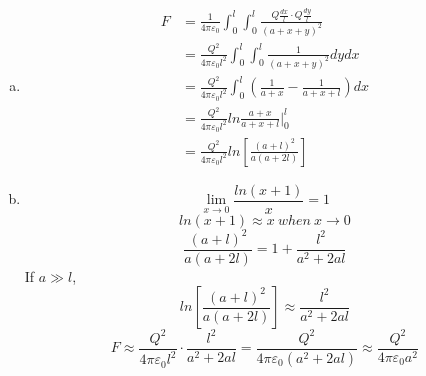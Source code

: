 \documentclass{article}
\begin{document}
\section{}
\begin{enumerate}[(a)]
\item
\begin{align*}
F&=\frac{1}{4\pi\varepsilon_0}\int_0^l\int_0^l\frac{Q\frac{dx}{l}\cdot Q\frac{dy}{l}}{(a+x+y)^2}\\
&=\frac{Q^2}{4\pi\varepsilon_0l^2}\int_0^l\int_0^l\frac{1}{(a+x+y)^2}dydx\\
&=\frac{Q^2}{4\pi\varepsilon_0l^2}\int_0^l\left(\frac{1}{a+x}-\frac{1}{a+x+l}\right)dx\\
&=\frac{Q^2}{4\pi\varepsilon_0l^2}ln\frac{a+x}{a+x+l}\bigg|_0^l\\
&=\frac{Q^2}{4\pi\varepsilon_0l^2}ln\left[\frac{(a+l)^2}{a(a+2l)}\right]
\end{align*}

\item
$$\lim_{x\to 0}\frac{ln(x+1)}{x}=1$$
$$ln(x+1)\approx x\ when\ x\to 0$$
$$\frac{(a+l)^2}{a(a+2l)}=1+\frac{l^2}{a^2+2al}$$
If $a\gg l$,
$$ln\left[\frac{(a+l)^2}{a(a+2l)}\right]\approx\frac{l^2}{a^2+2al}$$
$$F\approx\frac{Q^2}{4\pi\varepsilon_0l^2}\cdot\frac{l^2}{a^2+2al}
=\frac{Q^2}{4\pi\varepsilon_0(a^2+2al)}
\approx\frac{Q^2}{4\pi\varepsilon_0a^2}$$
\end{enumerate}
\end{document}
